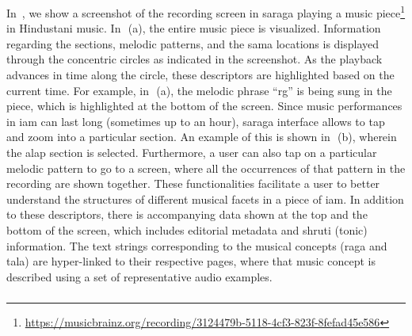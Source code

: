 In~, we show a screenshot of the recording screen in \gls{saraga} playing a music piece\footnote{\url{https://musicbrainz.org/recording/3124479b-5118-4cf3-823f-8fefad45e586}} in Hindustani music. In~\,(a), the entire music piece is visualized. Information regarding the sections, melodic patterns, and the \gls{sama} locations is displayed through the concentric circles as indicated in the screenshot. As the playback advances in time along the circle, these descriptors are highlighted based on the current time. For example, in~\,(a), the melodic phrase ``rg'' is being sung in the piece, which is highlighted at the bottom of the screen. Since music performances in \gls{iam} can last long (sometimes up to an hour), \gls{saraga} interface allows to tap and zoom into a particular section. An example of this is shown in~\,(b), wherein the \gls{alap} section is selected. Furthermore, a user can also tap on a particular melodic pattern to go to a screen, where all the occurrences of that pattern in the recording are shown together. These functionalities facilitate a user to better understand the structures of different musical facets in a piece of \gls{iam}. In addition to these descriptors, there is accompanying data shown at the top and the bottom of the screen, which includes editorial metadata and \gls{shruti} (tonic) information. The text strings corresponding to the musical concepts (\gls{raga} and \gls{tala}) are hyper-linked to their respective pages, where that music concept is described using a set of representative audio examples. 



\subsubsection{}
\label{sec:riyaz}

